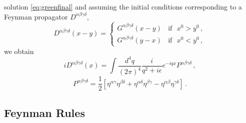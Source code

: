 \documentclass[11pt,a4paper]{article}
\newcommand{\be}{\begin{equation}}
\newcommand{\ee}{\end{equation}}
\begin{document}
solution \eqref{eq:greenfinal} and assuming the initial conditions corresponding to a Feynman propagator $D^{\alpha\beta\gamma\delta}$,
\be
 D^{\alpha\beta\gamma\delta}(x-y)=
 \begin{cases}
G^{\alpha\beta\gamma\delta}(x-y)~~~~\mathrm{if}~~~ x^0> y^0\,,\\
G^{\alpha\beta\gamma\delta}(y-x)~~~~\mathrm{if}~~~ x^0< y^0\,,
 \end{cases}
\ee
we obtain
\begin{equation}
iD^{\alpha\beta\gamma\delta}(x)=\int\dfrac{d^4q}{(2\pi)^4}\dfrac{i}{q^2+i\epsilon}e^{-iqx}P^{\alpha\beta\gamma\delta} \,,
\end{equation}
\begin{equation}\label{P}
P^{\alpha\beta\gamma\delta}=\dfrac{1}{2}\left[\eta^{\alpha\gamma}\eta^{\beta\delta}+\eta^{\alpha\delta}\eta^{\beta\gamma}-\eta^{\alpha\beta}\eta^{\gamma\delta}\right] \,.
\end{equation}

\subsection{Feynman Rules}
\end{document}
